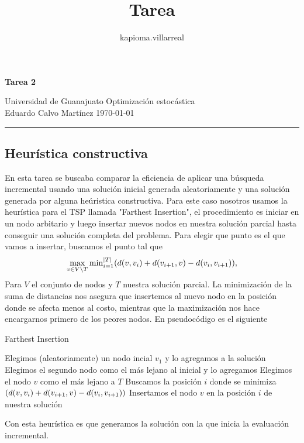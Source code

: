 \documentclass[11pt, letterpaper]{article}
\title{Tarea}
\author{kapioma.villarreal}
\theoremstyle{definition}
\DeclarePairedDelimiter{\paren}{(}{)}
\DeclarePairedDelimiter{\abs}{\lvert}{\rvert}
\begin{document}
\thispagestyle{empty} %
\noindent
\large  \begin{center}
\textbf{\LARGE Tarea 2}
\end{center} 
 Universidad de Guanajuato \hfill \large  Optimización estocástica\\
Eduardo Calvo Martínez \hfill \today\\
\noindent\rule{18cm}{1.5pt}
\normalsize
\subsection*{Heurística constructiva}
\noindent 
En esta tarea se buscaba comparar la eficiencia de aplicar una búsqueda incremental usando una solución inicial generada aleatoriamente y una solución generada por alguna heúristica constructiva. Para este caso nosotros usamos la heurística para el TSP llamada "Farthest Insertion", el procedimiento es iniciar en un nodo arbitario y luego insertar nuevos nodos en nuestra solución parcial hasta conseguir una solución completa del problema. Para elegir que punto es el que vamos a insertar, buscamos el punto tal que 
\[\max_{v\in V\setminus T} {\min}^{\abs{T}}_{i=1} \paren*{d(v, v_i)+d(v_{i+1},v) - d(v_i, v_{i+1})},\]
Para $V$ el conjunto de nodos y $T$ nuestra solución parcial. La minimización de la suma de distancias nos asegura que insertemos al nuevo nodo en la posición donde se afecta menos al costo, mientras que la maximización nos hace encargarnos primero de los peores nodos. En pseudocódigo es el siguiente
\begin{algorithm}
\caption{Farthest Insertion}
\begin{algorithmic}[1]
        \State Elegimos (aleatoriamente) un nodo incial $v_1$ y lo agregamos a la solución
        \State Elegimos el segundo nodo como el más lejano al inicial y lo agregamos
        \State Elegimos el nodo $v$ como el más lejano a $T$
        \State Buscamos la posición $i$ donde se minimiza $ \paren*{d(v, v_i)+d(v_{i+1},v) - d(v_i, v_{i+1})}$
        \State Insertamos el nodo $v$ en la posición $i$ de nuestra solución
        \EndWhile
    \EndProcedure
\end{algorithmic}
\end{algorithm}

\noindent Con esta heurística es que generamos la solución con la que inicia la evaluación incremental.
\end{document}
